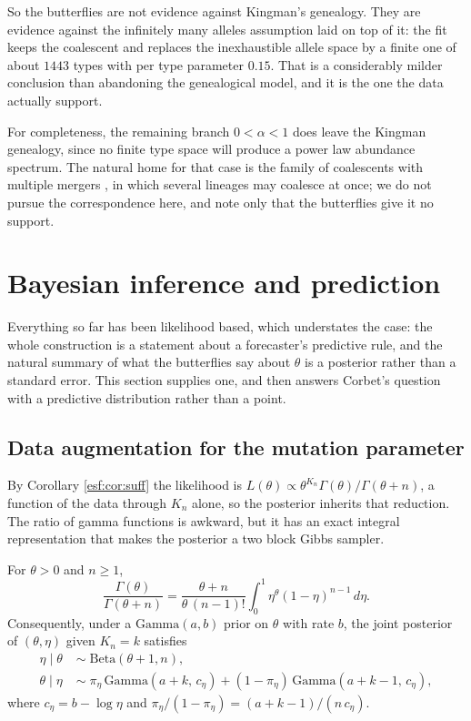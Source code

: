 So the butterflies are not evidence against Kingman's genealogy. They are evidence
against the infinitely many alleles assumption laid on top of it: the fit keeps the
coalescent and replaces the inexhaustible allele space by a finite one of about $1443$
types with per type parameter $0.15$. That is a considerably milder conclusion than
abandoning the genealogical model, and it is the one the data actually support.

For completeness, the remaining branch $0 < \alpha < 1$ does leave the Kingman
genealogy, since no finite type space will produce a power law abundance spectrum. The
natural home for that case is the family of coalescents with multiple mergers
\citep{esf:pitman1999}, in which several lineages may coalesce at once; we do not pursue
the correspondence here, and note only that the butterflies give it no support.

\section{Bayesian inference and prediction}
\label{esf:sec:bayes}

Everything so far has been likelihood based, which understates the case: the whole
construction is a statement about a forecaster's predictive rule, and the natural
summary of what the butterflies say about $\theta$ is a posterior rather than a
standard error. This section supplies one, and then answers Corbet's question with a
predictive distribution rather than a point.

\subsection{Data augmentation for the mutation parameter}

By Corollary \ref{esf:cor:suff} the likelihood is
$L(\theta) \propto \theta^{K_n} \Gamma(\theta)/\Gamma(\theta+n)$, a function of the
data through $K_n$ alone, so the posterior inherits that reduction. The ratio of gamma
functions is awkward, but it has an exact integral representation that makes the
posterior a two block Gibbs sampler.

\begin{proposition}
\label{esf:prop:ew}
For $\theta > 0$ and $n \ge 1$,
\begin{equation}
\frac{\Gamma(\theta)}{\Gamma(\theta+n)}
= \frac{\theta+n}{\theta \, (n-1)!} \int_0^1 \eta^{\theta} (1-\eta)^{n-1} \, d\eta .
\label{esf:eq:betaaug}
\end{equation}
Consequently, under a $\mathrm{Gamma}(a,b)$ prior on $\theta$ with rate $b$, the joint
posterior of $(\theta, \eta)$ given $K_n = k$ satisfies
\begin{align*}
\eta \mid \theta \; &\sim \; \mathrm{Beta}(\theta+1, n), \\
\theta \mid \eta \; &\sim \; \pi_\eta \, \mathrm{Gamma}(a+k, \, c_\eta)
+ (1 - \pi_\eta) \, \mathrm{Gamma}(a+k-1, \, c_\eta),
\end{align*}
where $c_\eta = b - \log \eta$ and
$\pi_\eta / (1-\pi_\eta) = (a+k-1) / (n \, c_\eta)$.
\end{proposition}

